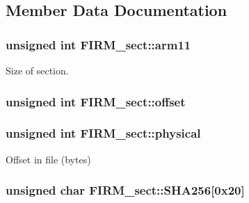 \subsection{Member Data Documentation}
\hypertarget{struct_f_i_r_m__sect_a1adcbe3a44c9e970460544dcf183a00d}{}
\subsubsection[{arm11}]{\setlength{\rightskip}{0pt plus 5cm}unsigned int F\+I\+R\+M\+\_\+sect\+::arm11}\label{struct_f_i_r_m__sect_a1adcbe3a44c9e970460544dcf183a00d}


Size of section. 

\hypertarget{struct_f_i_r_m__sect_a38377a781b05475fb3f23bb4c3044f6f}{}
\subsubsection[{offset}]{\setlength{\rightskip}{0pt plus 5cm}unsigned int F\+I\+R\+M\+\_\+sect\+::offset}\label{struct_f_i_r_m__sect_a38377a781b05475fb3f23bb4c3044f6f}
\hypertarget{struct_f_i_r_m__sect_a8a89063765a471aa8e823d2d673a549e}{}
\subsubsection[{physical}]{\setlength{\rightskip}{0pt plus 5cm}unsigned int F\+I\+R\+M\+\_\+sect\+::physical}\label{struct_f_i_r_m__sect_a8a89063765a471aa8e823d2d673a549e}


Offset in file (bytes) 

\hypertarget{struct_f_i_r_m__sect_a1fe1f999e70cc68c0435bf48ab66c895}{}
\subsubsection[{S\+H\+A256}]{\setlength{\rightskip}{0pt plus 5cm}unsigned char F\+I\+R\+M\+\_\+sect\+::\+S\+H\+A256\mbox{[}0x20\mbox{]}}\label{struct_f_i_r_m__sect_a1fe1f999e70cc68c0435bf48ab66c895}


